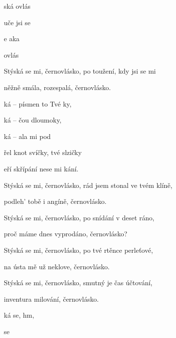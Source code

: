

\zs
{}ská  ovlás

uče  jsi se 

e aka

ovlás 
\ks

\zs
Stýská se mi, černovlásko, po toužení, kdy jsi se mi

něžně smála, rozespalá, černovlásko.
\ks

\zr
{}ká --  písmen to Tvé ky,

ká -- čou dloumoky,

ká -- ala  mi pod 

řel knot svíčky,  tvé slzičky

eří skřípání nese mi kání.
\kr

\zs
Stýská se mi, černovlásko, rád jsem stonal ve tvém klíně,

podleh' tobě i angíně, černovlásko.
\ks

\zs
Stýská se mi, černovlásko, po snídání v deset ráno,

proč máme dnes vyprodáno, černovlásko?
\ks


\zr \kr


\zs
Stýská se mi, černovlásko, po tvé rtěnce perleťové,

na ústa mě už neklove, černovlásko.
\ks

\zs
Stýská se mi, černovlásko, smutný je čas účtování,

inventura milování, černovlásko.
\ks

\zr \kr

\zr
{}ká se,  hm, 

 se   
\kr

\kp







